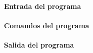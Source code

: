 \documentclass[letter,11pt]{article}
\begin{document}
\paragraph{Entrada del programa}
\begin{alltt}
\footnotesize

\normalsize
\end{alltt}

\paragraph{Comandos del programa}
\begin{alltt}
\footnotesize

\normalsize
\end{alltt}

\paragraph{Salida del programa}
\begin{alltt}
\footnotesize

\normalsize
\end{alltt}
\end{document}

